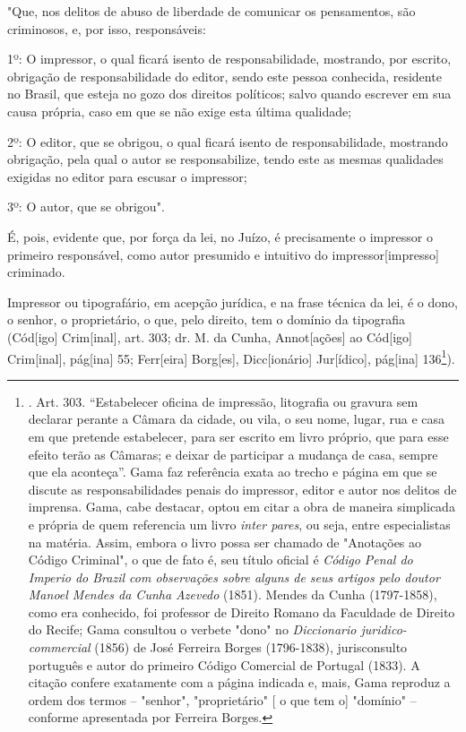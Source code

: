"Que, nos delitos de abuso de liberdade de comunicar os pensamentos, são
criminosos, e, por isso, responsáveis:

1º: O impressor, o qual ficará isento de responsabilidade, mostrando,
por escrito, obrigação de responsabilidade do editor, sendo este pessoa
conhecida, residente no Brasil, que esteja no gozo dos direitos
políticos; salvo quando escrever em sua causa própria, caso em que se
não exige esta última qualidade;

2º: O editor, que se obrigou, o qual ficará isento de responsabilidade,
mostrando obrigação, pela qual o autor se responsabilize, tendo este as
mesmas qualidades exigidas no editor para escusar o impressor;

3º: O autor, que se obrigou".

É, pois, evidente que, por força da lei, no Juízo, é precisamente o
impressor o primeiro responsável, como autor presumido e intuitivo do
impressor{[}impresso{]} criminado.

Impressor ou tipografário, em acepção jurídica, e na frase técnica da
lei, é o dono, o senhor, o proprietário, o que, pelo direito, tem o
domínio da tipografia (Cód{[}igo{]} Crim{[}inal{]}, art. 303; dr. M. da
Cunha, Annot{[}ações{]} ao Cód{[}igo{]} Crim{[}inal{]}, pág{[}ina{]} 55;
Ferr{[}eira{]} Borg{[}es{]}, Dicc{[}ionário{]} Jur{[}ídico{]},
pág{[}ina{]} 136\footnote{. Art. 303. ``Estabelecer oficina de
  impressão, litografia ou gravura sem declarar perante a Câmara da
  cidade, ou vila, o seu nome, lugar, rua e casa em que pretende
  estabelecer, para ser escrito em livro próprio, que para esse efeito
  terão as Câmaras; e deixar de participar a mudança de casa, sempre que
  ela aconteça''. Gama faz referência exata ao trecho e página em que se
  discute as responsabilidades penais do impressor, editor e autor nos
  delitos de imprensa. Gama, cabe destacar, optou em citar a obra de
  maneira simplicada e própria de quem referencia um livro \emph{inter
  pares}, ou seja, entre especialistas na matéria. Assim, embora o livro
  possa ser chamado de "Anotações ao Código Criminal", o que de fato é,
  seu título oficial é \emph{Código Penal do Imperio do Brazil com
  observações sobre alguns de seus artigos pelo doutor Manoel Mendes da
  Cunha Azevedo} (1851). Mendes da Cunha (1797-1858), como era
  conhecido, foi professor de Direito Romano da Faculdade de Direito do
  Recife; Gama consultou o verbete "dono" no \emph{Diccionario
  juridico-commercial} (1856) de José Ferreira Borges (1796-1838),
  jurisconsulto português e autor do primeiro Código Comercial de
  Portugal (1833). A citação confere exatamente com a página indicada e,
  mais, Gama reproduz a ordem dos termos -- "senhor", "proprietário" {[}
  o que tem o{]} "domínio" -- conforme apresentada por Ferreira Borges.}).


